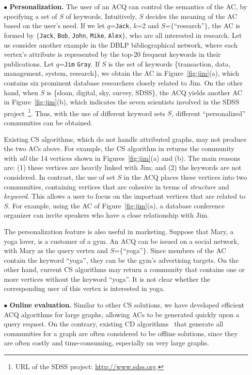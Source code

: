 \noindent $\bullet$ {\bf Personalization.}  The user of an ACQ can control the semantics of the AC, by specifying a set of $S$ of keywords. Intuitively, $S$ decides the meaning of the AC based on the user's need.  If we let $q$={\tt Jack}, $k$=2 and $S$=$\{$``research''$\}$,  the AC is formed by
$\{${\tt Jack}, {\tt Bob}, {\tt John}, {\tt Mike}, {\tt Alex}$\}$, who are all interested in research.
Let us consider another example in the DBLP bibliographical network, where each vertex's attribute is represented by the top-20 frequent keywords in their publications. Let $q$={\tt Jim} {\tt Gray}. If $S$ is the set of keywords \{transaction, data, management, system, research\}, we obtain the AC in Figure~\ref{fig:jim}(a), which contains six prominent database researchers closely related to Jim. On the other hand, when $S$ is \{sloan, digital, sky, survey, SDSS\}, the ACQ yields another AC in Figure~\ref{fig:jim}(b), which indicates the seven scientists involved in the SDSS project~\footnote{URL of the SDSS project: \url{http://www.sdss.org}.}.  Thus, with the use of different keyword sets $S$, different ``personalized'' communities can be obtained.

Existing CS algorithms, which do not handle attributed graphs, may not produce the two ACs above. For example, the CS algorithm in \cite{KDD2010} returns the community with {\it all} the 14 vertices shown in Figures~\ref{fig:jim}(a) and (b). The main reasons are: (1) these vertices are heavily linked with Jim; and (2) the keywords are not considered. In contrast, the use of set $S$ in the ACQ places these vertices into two communities, containing vertices that are cohesive in terms of {\it structure} and {\it keyword}. This allows a user to focus on the important vertices that are related to $S$. For example, using the AC of Figure~\ref{fig:jim}(a), a database conference organizer can invite speakers who have a close relationship with Jim.

The personalization feature is also useful in marketing. Suppose that Mary, a yoga lover, is a customer of a gym. An ACQ can be issued on a social network, with Mary as the query vertex and $S$=$\{$``yoga''$\}$. Since members of the AC contain the keyword ``yoga'', they can be the gym's advertising targets. On the other hand, current CS algorithms may return a community that contains one or more vertices without the keyword ``yoga''. It is not clear whether the corresponding user of this vertex is interested in yoga.

\noindent $\bullet$ {\bf Online evaluation.}  Similar to other CS solutions, we have developed efficient ACQ algorithms for large graphs, allowing ACs to be generated quickly upon a query request. On the contrary, existing CD algorithms~\cite{attr-vldb2009,attr-www2013,attr-topic-kdd2008,attr-topic-icml2009} that generate all communities for a graph are often considered to be offline solutions, since they are often costly and time-consuming, especially on very large graphs.


